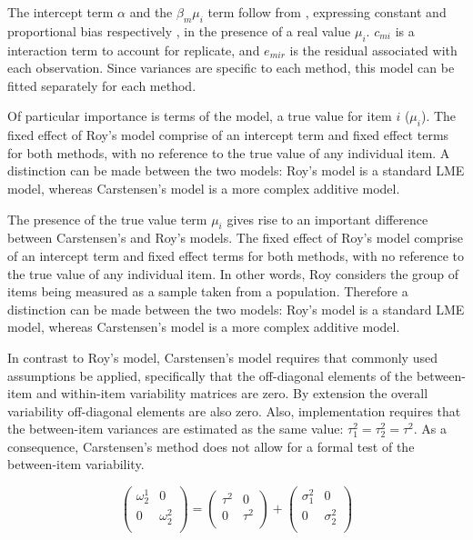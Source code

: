 \documentclass[12pt, a4paper]{report}
\theoremstyle{plain}
\theoremstyle{definition}
\theoremstyle{remark}
\begin{document}
The intercept term $\alpha$ and the $\beta_{m}\mu_{i}$ term follow from \citet{DunnSEME}, expressing constant and proportional bias
respectively , in the presence of a real value $\mu_{i}.$ $c_{mi}$ is a interaction term to account for replicate, and
$e_{mir}$ is the residual associated with each observation. Since variances are specific to each method, this model can be
fitted separately for each method.


Of particular importance is terms of the model, a true value for item $i$ ($\mu_{i}$).  The fixed effect of Roy's model comprise of an intercept term and fixed effect terms for both methods, with no reference to the true value of any individual item. A distinction can be made between the two models: Roy's model is a standard LME model, whereas Carstensen's model is a more complex additive model.

The presence of the true value term $\mu_i$ gives rise to an important difference between Carstensen's and Roy's models. The fixed effect of Roy's model comprise of an intercept term and fixed effect terms for both methods, with no reference to the true value of any individual item. In other words, Roy considers the group of items being measured as a sample taken from a population. Therefore a distinction can be made between the two models: Roy's model is a standard LME model, whereas Carstensen's model is a more complex additive model.




In contrast to Roy's model, Carstensen's model requires that commonly used assumptions be applied, specifically that the off-diagonal elements of the between-item and within-item variability matrices are zero. By
extension the overall variability off-diagonal elements are also zero. Also, implementation requires that the between-item variances are estimated as the same value: $\tau^2_1 = \tau^2_2 = \tau^2$.
As a consequence, Carstensen's method does not allow for a formal test of the between-item variability.


\[\left(\begin{array}{cc}
\omega^1_2  & 0 \\
0 & \omega^2_2 \\
\end{array}  \right)
=  \left(
\begin{array}{cc}
\tau^2  & 0 \\
0 & \tau^2 \\
\end{array} \right)+
\left(
\begin{array}{cc}
\sigma^2_1  & 0 \\
0 & \sigma^2_2 \\
\end{array}\right)
\]
\end{document}
